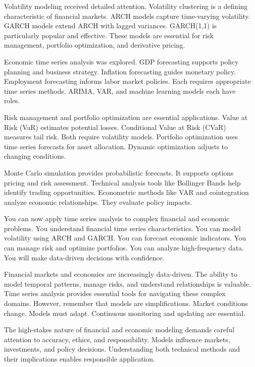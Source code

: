 Volatility modeling received detailed attention. Volatility clustering is a defining characteristic of financial markets. ARCH models capture time-varying volatility. GARCH models extend ARCH with lagged variances. GARCH(1,1) is particularly popular and effective. These models are essential for risk management, portfolio optimization, and derivative pricing.

Economic time series analysis was explored. GDP forecasting supports policy planning and business strategy. Inflation forecasting guides monetary policy. Employment forecasting informs labor market policies. Each requires appropriate time series methods. ARIMA, VAR, and machine learning models each have roles.

Risk management and portfolio optimization are essential applications. Value at Risk (VaR) estimates potential losses. Conditional Value at Risk (CVaR) measures tail risk. Both require volatility models. Portfolio optimization uses time series forecasts for asset allocation. Dynamic optimization adjusts to changing conditions.

Monte Carlo simulation provides probabilistic forecasts. It supports options pricing and risk assessment. Technical analysis tools like Bollinger Bands help identify trading opportunities. Econometric methods like VAR and cointegration analyze economic relationships. They evaluate policy impacts.

You can now apply time series analysis to complex financial and economic problems. You understand financial time series characteristics. You can model volatility using ARCH and GARCH. You can forecast economic indicators. You can manage risk and optimize portfolios. You can analyze high-frequency data. You will make data-driven decisions with confidence.

Financial markets and economies are increasingly data-driven. The ability to model temporal patterns, manage risks, and understand relationships is valuable. Time series analysis provides essential tools for navigating these complex domains. However, remember that models are simplifications. Market conditions change. Models must adapt. Continuous monitoring and updating are essential.

The high-stakes nature of financial and economic modeling demands careful attention to accuracy, ethics, and responsibility. Models influence markets, investments, and policy decisions. Understanding both technical methods and their implications enables responsible application.

